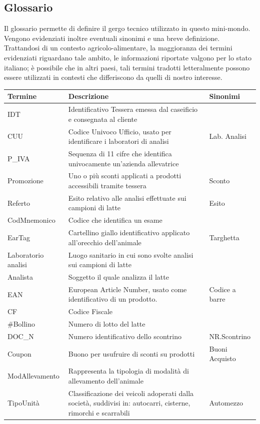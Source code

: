 \documentclass[12pt]{report}
\begin{document}
\newpage

\subsection{Glossario}

Il glossario permette di definire il gergo tecnico utilizzato in questo mini-mondo. Vengono evidenziati inoltre eventuali sinonimi e una breve definizione. Trattandosi di un contesto agricolo-alimentare, la maggioranza dei termini evidenziati riguardano tale ambito, le informazioni riportate valgono per lo stato italiano; è possibile che in altri paesi, tali termini tradotti letteralmente possono essere utilizzati in contesti che differiscono da quelli di nostro interesse. \\[0.0cm]


\begin{tabular}{ |p{3cm}|p{10cm}|p{3cm}|  }
 \hline
 Termine & Descrizione & Sinonimi\\
 \hline
 IDT   & Identificativo Tessera emessa dal caseificio e consegnata al cliente  &     \\ \hline
 CUU   & Codice Univoco Ufficio, usato per identificare i laboratori
di analisi    & Lab. Analisi  \\ \hline
 P\_IVA   &  Sequenza di 11 cifre che identifica univocamente un'azienda allevatrice &   \\ \hline
 Promozione   & Uno o più sconti applicati a prodotti accessibili tramite tessera    & Sconto \\ \hline
 Referto   & Esito relativo alle analisi  effettuate sui campioni di latte   & Esito\\ \hline
 CodMnemonico    & Codice che identifica un esame   &    \\ \hline
 EarTag     & Cartellino giallo identificativo applicato all'orecchio dell'animale      & Targhetta\\ \hline
 Laboratorio analisi      & Luogo sanitario in cui sono svolte analisi sui campioni di latte & \\ \hline
 Analista      & Soggetto il quale analizza il latte  &  \\ \hline
 EAN         & European Article Number, usato come identificativo di un prodotto.     & Codice a barre\\ \hline
 CF &   Codice Fiscale & \\ \hline
 \#Bollino & Numero di lotto del latte & \\ \hline
 DOC\_N       & Numero identificativo dello scontrino     &  NR.Scontrino \\ \hline
 Coupon &  Buono per usufruire di sconti su prodotti         & Buoni Acquisto \\ \hline
 ModAllevamento &  Rappresenta la tipologia di modalità di allevamento dell'animale  & \\ \hline
 TipoUnità &  Classificazione dei veicoli adoperati dalla società, suddivisi in: autocarri, cisterne, rimorchi e scarrabili &  Automezzo  \\ \hline
 
\end{tabular}
\end{document}
